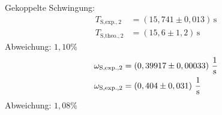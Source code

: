 Gekoppelte Schwingung:\\
\begin{align*}
    T_{\text{S,exp.},2} &= \left( 15,741 \pm 0,013 \right)\,\unit{\second}\\
    T_{\text{S,theo.},2} &= \left( 15,6 \pm 1,2 \right)\,\unit{\second}
\end{align*}
Abweichung: $1,10\%$
\begin{align*}
    \omega_{\text{S,exp.},2} &= \left( 0,39917 \pm 0,00033  \right)\, \unit[per-mode=fraction]{\per\second}\\
    \omega_{\text{S,exp.},2} &= \left( 0,404 \pm 0,031  \right)\, \unit[per-mode=fraction]{\per\second}
\end{align*}
Abweichung: $1,08\%$
